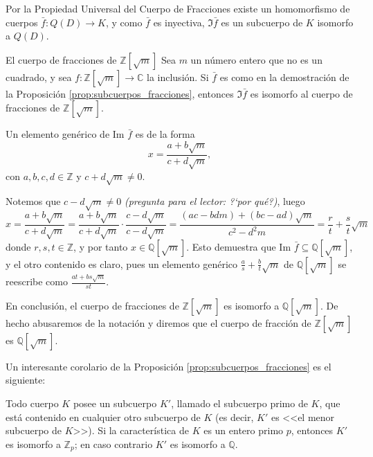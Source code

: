 \begin{proofbox}
Por la Propiedad Universal del Cuerpo de Fracciones existe un homomorfismo de cuerpos \(\bar{f}: Q(D) \to K\), y como \(\bar{f}\) es inyectiva, \(\Im \bar{f}\) es un subcuerpo de \(K\) isomorfo a \(Q(D)\).
\end{proofbox}

\begin{example}{El cuerpo de fracciones de \(\mathbb{Z}[\sqrt{m}]\)}{}
Sea \(m\) un número entero que no es un cuadrado, y sea \(f: \mathbb{Z}[\sqrt{m}] \to \mathbb{C}\) la inclusión. Si \(\bar{f}\) es como en la demostración de la Proposición \ref{prop:subcuerpos_fracciones}, entonces \(\Im \bar{f}\) es isomorfo al cuerpo de fracciones de \(\mathbb{Z}[\sqrt{m}]\).

Un elemento genérico de Im \(\bar{f}\) es de la forma
\[
x = \frac{a + b\sqrt{m}}{c + d\sqrt{m}},
\]
con \(a, b, c, d \in \mathbb{Z}\) y \(c + d\sqrt{m} \neq 0\). 

Notemos que \(c - d\sqrt{m} \neq 0\) \emph{(pregunta para el lector: ?`por qué?)}, luego
\[
x = \frac{a + b\sqrt{m}}{c + d\sqrt{m}} = \frac{a + b\sqrt{m}}{c + d\sqrt{m}} \cdot \frac{c - d\sqrt{m}}{c - d\sqrt{m}} = \frac{(ac-bdm) + (bc - ad)\sqrt{m}}{c^2 - d^2m} = \frac{r}{t} + \frac{s}{t}\sqrt{m}
\]
donde \(r, s, t \in \mathbb{Z}\), y por tanto \(x \in \mathbb{Q}[\sqrt{m}]\). Esto demuestra que Im \(\bar{f} \subseteq \mathbb{Q}[\sqrt{m}]\), y el otro contenido es claro, pues un elemento genérico \(\frac{a}{s} + \frac{b}{t}\sqrt{m}\) de \(\mathbb{Q}[\sqrt{m}]\) se reescribe como \(\frac{at + bs\sqrt{m}}{st}\).

En conclusión, el cuerpo de fracciones de \(\mathbb{Z}[\sqrt{m}]\) es isomorfo a \(\mathbb{Q}[\sqrt{m}]\). De hecho abusaremos de la notación y diremos que el cuerpo de fracción de \(\mathbb{Z}[\sqrt{m}]\) es \(\mathbb{Q}[\sqrt{m}]\).
\end{example}

Un interesante corolario de la Proposición \ref{prop:subcuerpos_fracciones} es el siguiente:

\begin{corollary}{}{}
Todo cuerpo \(K\) posee un subcuerpo \(K'\), llamado el subcuerpo primo de \(K\), que está contenido en cualquier otro subcuerpo de \(K\) (es decir, \(K'\) es <<el menor subcuerpo de \(K\)>>). Si la característica de \(K\) es un entero primo \(p\), entonces \(K'\) es isomorfo a \(\mathbb{Z}_p\); en caso contrario \(K'\) es isomorfo a \(\mathbb{Q}\).
\end{corollary}

